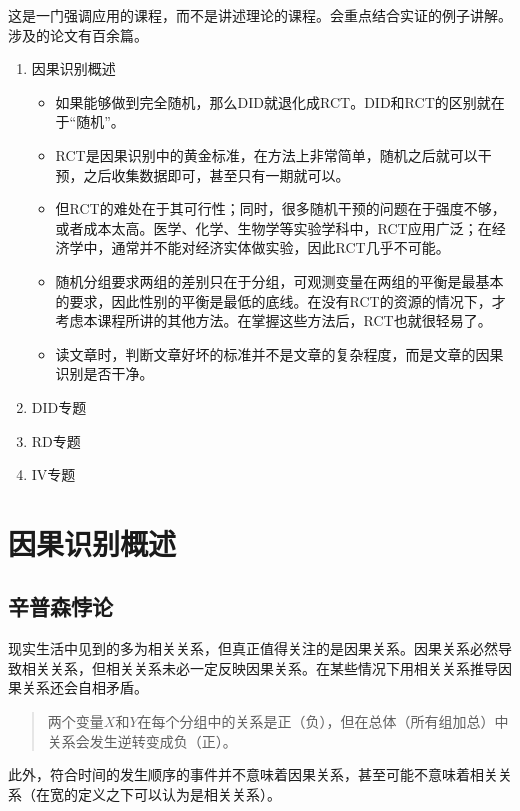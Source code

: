 \documentclass[11pt,a4paper]{ctexart}
\begin{document}
这是一门强调应用的课程，而不是讲述理论的课程。会重点结合实证的例子讲解。涉及的论文有百余篇。

\begin{enumerate}
\def\labelenumi{\arabic{enumi}.}
\item
  因果识别概述

  \begin{itemize}
  \item
    如果能够做到完全随机，那么DID就退化成RCT。DID和RCT的区别就在于``随机''。
  \item
    RCT是因果识别中的黄金标准，在方法上非常简单，随机之后就可以干预，之后收集数据即可，甚至只有一期就可以。
  \item
    但RCT的难处在于其可行性；同时，很多随机干预的问题在于强度不够，或者成本太高。医学、化学、生物学等实验学科中，RCT应用广泛；在经济学中，通常并不能对经济实体做实验，因此RCT几乎不可能。
  \item
    随机分组要求两组的差别只在于分组，可观测变量在两组的平衡是最基本的要求，因此性别的平衡是最低的底线。在没有RCT的资源的情况下，才考虑本课程所讲的其他方法。在掌握这些方法后，RCT也就很轻易了。
  \item
    读文章时，判断文章好坏的标准并不是文章的复杂程度，而是文章的因果识别是否干净。
  \end{itemize}
\item
  DID专题
\item
  RD专题
\item
  IV专题
\end{enumerate}

\section{因果识别概述}

\subsection{辛普森悖论}

现实生活中见到的多为相关关系，但真正值得关注的是因果关系。因果关系必然导致相关关系，但相关关系未必一定反映因果关系。在某些情况下用相关关系推导因果关系还会自相矛盾。

\begin{quote}
两个变量\(X\)和\(Y\)在每个分组中的关系是正（负），但在总体（所有组加总）中关系会发生逆转变成负（正）。
\end{quote}

此外，符合时间的发生顺序的事件并不意味着因果关系，甚至可能不意味着相关关系（在宽的定义之下可以认为是相关关系）。
\end{document}
